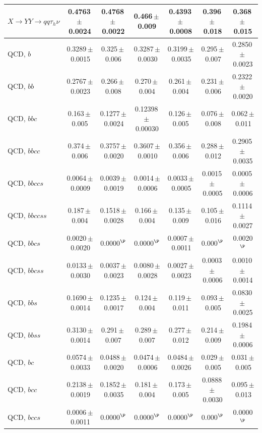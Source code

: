 \documentclass[12pt]{article}   %
\begin{document}
\begin{landscape}
{\begin{longtable}{@{\extracolsep{\fill}}lcccccc@{}}
$X\to YY\to qq\tau_h\nu$ & 0.4763\,$\pm$\,0.0024 & 0.4768\,$\pm$\,0.0022 & 0.466\,$\pm$\,0.009 & 0.4393\,$\pm$\,0.0008 & 0.396\,$\pm$\,0.018 & 0.368\,$\pm$\,0.015 \\
\midrule
QCD, $b$ & 0.3289\,$\pm$\,0.0015 & 0.325\,$\pm$\,0.006 & 0.3287\,$\pm$\,0.0030 & 0.3199\,$\pm$\,0.0035 & 0.295\,$\pm$\,0.007 & 0.2850\,$\pm$\,0.0023 \\
QCD, $bb$ & 0.2767\,$\pm$\,0.0023 & 0.266\,$\pm$\,0.008 & 0.270\,$\pm$\,0.004 & 0.261\,$\pm$\,0.004 & 0.231\,$\pm$\,0.006 & 0.2322\,$\pm$\,0.0020 \\
QCD, $bbc$ & 0.163\,$\pm$\,0.005 & 0.1277\,$\pm$\,0.0024 & 0.12398\,$\pm$\,0.00030 & 0.126\,$\pm$\,0.005 & 0.076\,$\pm$\,0.008 & 0.062\,$\pm$\,0.011 \\
QCD, $bbcc$ & 0.374\,$\pm$\,0.006 & 0.3757\,$\pm$\,0.0020 & 0.3607\,$\pm$\,0.0010 & 0.356\,$\pm$\,0.006 & 0.288\,$\pm$\,0.012 & 0.2905\,$\pm$\,0.0035 \\
QCD, $bbccs$ & 0.0064\,$\pm$\,0.0009 & 0.0039\,$\pm$\,0.0019 & 0.0014\,$\pm$\,0.0006 & 0.0033\,$\pm$\,0.0005 & 0.0015\,$\pm$\,0.0005 & 0.0005\,$\pm$\,0.0006 \\
QCD, $bbccss$ & 0.187\,$\pm$\,0.004 & 0.1518\,$\pm$\,0.0028 & 0.166\,$\pm$\,0.004 & 0.135\,$\pm$\,0.009 & 0.105\,$\pm$\,0.016 & 0.1114\,$\pm$\,0.0027 \\
QCD, $bbcs$ & 0.0020\,$\pm$\,0.0020 & 0.0000$^{\P}$ & 0.0000$^{\P}$ & 0.0007\,$\pm$\,0.0011 & 0.000$^{\P}$ & 0.0020$^{\P}$ \\
QCD, $bbcss$ & 0.0133\,$\pm$\,0.0030 & 0.0037\,$\pm$\,0.0023 & 0.0080\,$\pm$\,0.0028 & 0.0027\,$\pm$\,0.0023 & 0.0003\,$\pm$\,0.0006 & 0.0010\,$\pm$\,0.0014 \\
QCD, $bbs$ & 0.1690\,$\pm$\,0.0014 & 0.1235\,$\pm$\,0.0017 & 0.124\,$\pm$\,0.004 & 0.119\,$\pm$\,0.011 & 0.093\,$\pm$\,0.005 & 0.0830\,$\pm$\,0.0025 \\
QCD, $bbss$ & 0.3130\,$\pm$\,0.0014 & 0.291\,$\pm$\,0.007 & 0.289\,$\pm$\,0.007 & 0.277\,$\pm$\,0.012 & 0.214\,$\pm$\,0.009 & 0.1984\,$\pm$\,0.0006 \\
QCD, $bc$ & 0.0574\,$\pm$\,0.0033 & 0.0488\,$\pm$\,0.0020 & 0.0474\,$\pm$\,0.0006 & 0.0484\,$\pm$\,0.0026 & 0.029\,$\pm$\,0.005 & 0.031\,$\pm$\,0.005 \\
QCD, $bcc$ & 0.2138\,$\pm$\,0.0019 & 0.1852\,$\pm$\,0.0035 & 0.181\,$\pm$\,0.004 & 0.173\,$\pm$\,0.005 & 0.0888\,$\pm$\,0.0030 & 0.095\,$\pm$\,0.013 \\
QCD, $bccs$ & 0.0006\,$\pm$\,0.0011 & 0.0000$^{\P}$ & 0.0000$^{\P}$ & 0.0000$^{\P}$ & 0.000$^{\P}$ & 0.0000$^{\P}$ \\

\end{longtable}}
\end{landscape}
\end{document}
